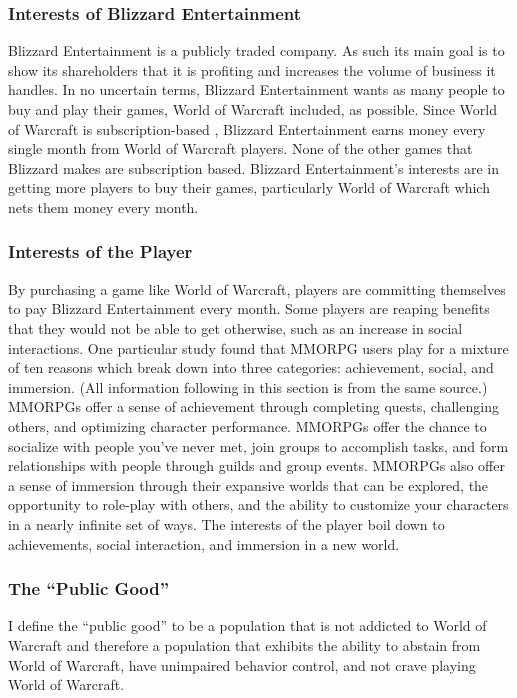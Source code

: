 \documentclass[11pt]{article}
\begin{document}
\begin{multicols}{2}
\subsubsection{Interests of Blizzard Entertainment}
Blizzard Entertainment is a publicly traded company. \cite{BlizzStock} As such its main goal is to show its shareholders that it is profiting and increases the volume of business it handles. In no uncertain terms, Blizzard Entertainment wants as many people to buy and play their games, World of Warcraft included, as possible. Since World of Warcraft is subscription-based \cite{WoWSubscription}, Blizzard Entertainment earns money every single month from World of Warcraft players. None of the other games that Blizzard makes are subscription based. \cite{BlizzGameList} Blizzard Entertainment's interests are in getting more players to buy their games, particularly World of Warcraft which nets them money every month.
\subsubsection{Interests of the Player}
By purchasing a game like World of Warcraft, players are committing themselves to pay Blizzard Entertainment every month. Some players are reaping benefits that they would not be able to get otherwise, such as an increase in social interactions. \cite{IsThereEvidenceOfInternetAddiction} One particular study found that MMORPG users play for a mixture of ten reasons which break down into three categories: achievement, social, and immersion. \cite{PlayerMotivations} (All information following in this section is from the same source.) MMORPGs offer a sense of achievement through completing quests, challenging others, and optimizing character performance. MMORPGs offer the chance to socialize with people you've never met, join groups to accomplish tasks, and form relationships with people through guilds and group events. MMORPGs also offer a sense of immersion through their expansive worlds that can be explored, the opportunity to role-play with others, and the ability to customize your characters in a nearly infinite set of ways. The interests of the player boil down to achievements, social interaction, and immersion in a new world.
\subsubsection{The ``Public Good''}
I define the ``public good'' to be a population that is not addicted to World of Warcraft and therefore a population that exhibits the ability to abstain from World of Warcraft, have unimpaired behavior control, and not crave playing World of Warcraft.


\end{multicols}
\end{document}
